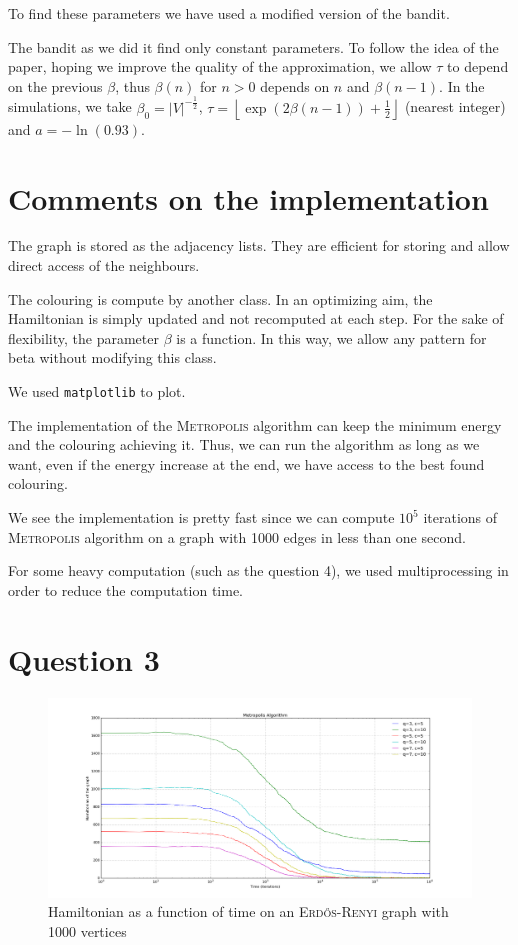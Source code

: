 \documentclass[a4paper, 11pt]{article}
\newcommand{\floor}[1]{{\left\lfloor #1 \right\rfloor}}
\begin{document}
To find these parameters we have used a modified version of the bandit. 

The bandit as we did it find only constant parameters. To follow the idea of the paper, hoping we improve the quality of the approximation, we allow $\tau$ to depend on the previous $\beta$, thus $\beta(n)$ for $n>0$ depends on $n$ and $\beta(n-1)$. In the simulations, we take $\beta_0 = {\lvert V\rvert}^{-\frac{1}{2}}$, $\tau = \floor{\exp(2\beta(n-1))+\frac{1}{2}}$ (nearest integer) and $a = -\ln(0.93)$.

\section{Comments on the implementation}

The graph is stored as the adjacency lists. They are efficient for storing and allow direct access of the neighbours.

The colouring is compute by another class. In an optimizing aim, the Hamiltonian is simply updated and not recomputed at each step. For the sake of flexibility, the parameter $\beta$ is a function. In this way, we allow any pattern for beta without modifying this class.

We used \texttt{matplotlib} to plot.

The implementation of the \textsc{Metropolis} algorithm can keep the minimum energy and the colouring achieving it. Thus, we can run the algorithm as long as we want, even if the energy increase at the end, we have access to the best found colouring.

We see the implementation is pretty fast since we can compute $10^5$ iterations of \textsc{Metropolis} algorithm on a graph with 1000 edges in less than one second.

For some heavy computation (such as the question 4), we used multiprocessing in order to reduce the computation time.

\section{Question 3}

\begin{figure}[!ht]
	\centering
	\includegraphics[width=\textwidth]{figures/q3}
	\caption{Hamiltonian as a function of time on an \textsc{Erd\H{o}s-Renyi} graph with 1000 vertices}
\end{figure}
\end{document}
